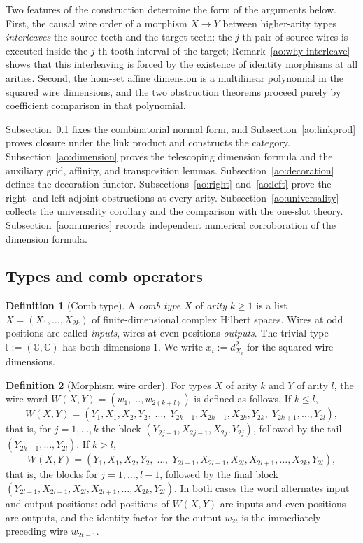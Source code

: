 \documentclass[11pt,a4paper]{article}
\theoremstyle{definition}
\newtheorem{definition}{Definition}[section]
\theoremstyle{plain}
\theoremstyle{remark}
\begin{document}
Two features of the construction determine the form of the arguments
below. First, the causal wire order of a morphism $X\to Y$ between
higher-arity types \emph{interleaves} the source teeth and the target
teeth: the $j$-th pair of source wires is executed inside the $j$-th
tooth interval of the target; Remark~\ref{ao:why-interleave} shows that
this interleaving is forced by the existence of identity morphisms at
all arities. Second, the hom-set affine dimension is a multilinear
polynomial in the squared wire dimensions, and the two obstruction
theorems proceed purely by coefficient comparison in that polynomial.

Subsection~\ref{ao:category} fixes the combinatorial normal form, and
Subsection~\ref{ao:linkprod} proves closure under the link product and
constructs the category. Subsection~\ref{ao:dimension} proves the
telescoping dimension formula and the auxiliary grid, affinity, and
transposition lemmas. Subsection~\ref{ao:decoration} defines the
decoration functor. Subsections~\ref{ao:right} and~\ref{ao:left} prove
the right- and left-adjoint obstructions at every arity.
Subsection~\ref{ao:universality} collects the universality corollary
and the comparison with the one-slot theory.
Subsection~\ref{ao:numerics} records independent numerical
corroboration of the dimension formula.


\subsection{Types and comb operators}
\label{ao:category}

\begin{definition}[Comb type]
A \emph{comb type} $X$ of \emph{arity} $k\ge 1$ is a list
$X=(X_1,\dots,X_{2k})$ of finite-dimensional complex Hilbert spaces. Wires
at odd positions are called \emph{inputs}, wires at even positions
\emph{outputs}. The trivial type $\mathbb I:=(\mathbb C,\mathbb C)$ has both
dimensions $1$. We write $x_i:=d_{X_i}^2$ for the squared wire dimensions.
\end{definition}

\begin{definition}[Morphism wire order]
\label{ao:wireorder}
For types $X$ of arity $k$ and $Y$ of arity $l$, the wire word
$W(X,Y)=(w_1,\dots,w_{2(k+l)})$ is defined as follows. If $k\le l$,
\[
W(X,Y)=(Y_1,X_1,X_2,Y_2,\;\dots,\;Y_{2k-1},X_{2k-1},X_{2k},Y_{2k},
\;Y_{2k+1},\dots,Y_{2l}),
\]
that is, for $j=1,\dots,k$ the block $(Y_{2j-1},X_{2j-1},X_{2j},Y_{2j})$,
followed by the tail $(Y_{2k+1},\dots,Y_{2l})$. If $k>l$,
\[
W(X,Y)=(Y_1,X_1,X_2,Y_2,\;\dots,\;Y_{2l-1},X_{2l-1},X_{2l},
X_{2l+1},\dots,X_{2k},Y_{2l}),
\]
that is, the blocks for $j=1,\dots,l-1$, followed by the final block
$(Y_{2l-1},X_{2l-1},X_{2l},X_{2l+1},\dots,X_{2k},Y_{2l})$.
In both cases the word alternates input and output positions: odd positions
of $W(X,Y)$ are inputs and even positions are outputs, and the identity
factor for the output $w_{2t}$ is the immediately preceding wire $w_{2t-1}$.
\end{definition}
\end{document}
